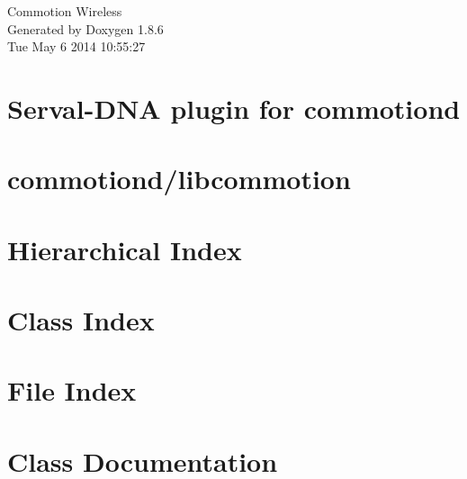 \documentclass[twoside]{book}
\newcommand{\clearemptydoublepage}{%
  \newpage{\pagestyle{empty}\cleardoublepage}%
}
\begin{document}
\hypersetup{pageanchor=false}
\begin{titlepage}
\vspace*{7cm}
\begin{center}%
{\Large Commotion Wireless }\\
\vspace*{1cm}
{\large Generated by Doxygen 1.8.6}\\
\vspace*{0.5cm}
{\small Tue May 6 2014 10:55:27}\\
\end{center}
\end{titlepage}
\clearemptydoublepage
\tableofcontents
\clearemptydoublepage
{}
\hypersetup{pageanchor=true}

\chapter{Serval-\/\-D\-N\-A plugin for commotiond}
\label{md_plugins_serval-dna_README}
\hypertarget{md_plugins_serval-dna_README}{}

\chapter{commotiond/libcommotion}
\label{md_README}
\hypertarget{md_README}{}

\chapter{Hierarchical Index}

\chapter{Class Index}

\chapter{File Index}

\chapter{Class Documentation}





































\end{document}
